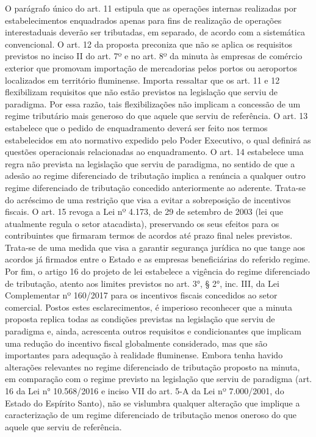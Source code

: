 \documentclass[10pt]{article}
\begin{document}
O parágrafo único do art. 11 estipula que as operações internas realizadas por estabelecimentos enquadrados apenas para fins de realização de operações interestaduais deverão ser tributadas, em separado, de acordo com a sistemática convencional.
O art. 12 da proposta preconiza que não se aplica os requisitos previstos no inciso II do art. 7º e no art. 8º da minuta às empresas de comércio exterior que promovam importação de mercadorias pelos portos ou aeroportos localizados em território fluminense. 
Importa ressaltar que os art. 11 e 12 flexibilizam requisitos que não estão previstos na legislação que serviu de paradigma. Por essa razão, tais flexibilizações não implicam a concessão de um regime tributário mais generoso do que aquele que serviu de referência.
O art. 13 estabelece que o pedido de enquadramento deverá ser feito nos termos estabelecidos em ato normativo expedido pelo Poder Executivo, o qual definirá as questões operacionais relacionadas ao enquadramento.
O art. 14 estabelece uma regra não prevista na legislação que serviu de paradigma, no sentido de que a adesão ao regime diferenciado de tributação implica a renúncia a qualquer outro regime diferenciado de tributação concedido anteriormente ao aderente. Trata-se do acréscimo de uma restrição que visa a evitar a sobreposição de incentivos fiscais. 
O art. 15 revoga a Lei nº 4.173, de 29 de setembro de 2003 (lei que atualmente regula o setor atacadista), preservando os seus efeitos para os contribuintes que firmaram termos de acordos até prazo final neles previstos. Trata-se de uma medida que visa a garantir segurança jurídica no que tange aos acordos já firmados entre o Estado e as empresas beneficiárias do referido regime.
Por fim, o artigo 16 do projeto de lei estabelece a vigência do regime diferenciado de tributação, atento aos limites previstos no art. 3°, § 2°, inc. III, da Lei Complementar nº 160/2017 para os incentivos fiscais concedidos ao setor comercial.
Postos estes esclarecimentos, é imperioso reconhecer que a minuta proposta replica todas as condições previstas na legislação que serviu de paradigma e, ainda, acrescenta outros requisitos e condicionantes que implicam uma redução do incentivo fiscal globalmente considerado, mas que são importantes para adequação à realidade fluminense.
Embora tenha havido alterações relevantes no regime diferenciado de tributação proposto na minuta, em comparação com o regime previsto na legislação que serviu de paradigma (art. 16 da Lei n° 10.568/2016 e inciso VII do art. 5-A da Lei nº 7.000/2001, do Estado do Espírito Santo), não se vislumbra qualquer alteração que implique a caracterização de um regime diferenciado de tributação menos oneroso do que aquele que serviu de referência. 
\end{document}
